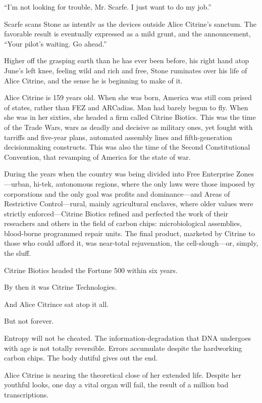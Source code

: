 ``I'm not looking for trouble, Mr. Scarfe. I just want to do my job.''

Scarfe scans Stone as intentlv as the devices outside Alice Citrine's sanctum. The favorable result is eventually expressed as a mild grunt, and the announcement, ``Your pilot's waiting. Go ahead.''

Higher off the grasping earth than he has ever been before, his right hand atop June's left knee, feeling wild and rich and free, Stone ruminates over his life of Alice Citrine, and the sense he is beginning to make of it.

Alice Citrine is 159 years old. When she was born, America was still com prised of states, rather than FEZ and ARCadias. Man had barely begun to fly. When she was in her sixties, she headed a firm called Citrine Biotics. This was the time of the Trade Wars, wars as deadly and decisive as military ones, yet fought with tarriffs and five-year plans, automated assembly lines and fifth-generation decisionmaking constructs. This was also the time of the Second Constitutional Convention, that revamping of America for the state of war.

During the years when the country was being divided into Free Enterprise Zones---urban, hi-tek, autonomous regions, where the only laws were those imposed by corporations and the only goal was profits and dominance---and Areas of Restrictive Control---rural, mainly agricultural enclaves, where older values were strictly enforced---Citrine Biotics refined and perfected the work of their reseachers and others in the field of carbon chips: microbiological assemblies, blood-borne programmed repair units. The final product, marketed by Citrine to those who could afford it, was near-total rejuvenation, the cell-slough---or, simply, the sluff.

Citrine Biotics headed the Fortune 500 within six years.

By then it was Citrine Technologies.

And Alice Citrince sat atop it all.

But not forever.

Entropy will not be cheated. The information-degradation that DNA undergoes with age is not totally reversible. Errors accumulate despite the hardworking carbon chips. The body dutiful gives out the end.

Alice Citrine is nearing the theoretical close of her extended life. Despite her youthful looks, one day a vital organ will fail, the result of a million bad transcriptions.

